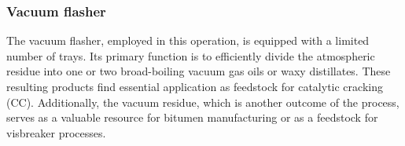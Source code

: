 \subsubsection{Vacuum flasher}
The vacuum flasher, employed in this operation, is equipped with a limited number of trays.
Its primary function is to efficiently divide the atmospheric residue into one or two broad-boiling vacuum gas oils or waxy distillates.
These resulting products find essential application as feedstock for catalytic cracking (CC).
Additionally, the vacuum residue, which is another outcome of the process, serves as a valuable resource for bitumen manufacturing or as a feedstock for visbreaker processes.